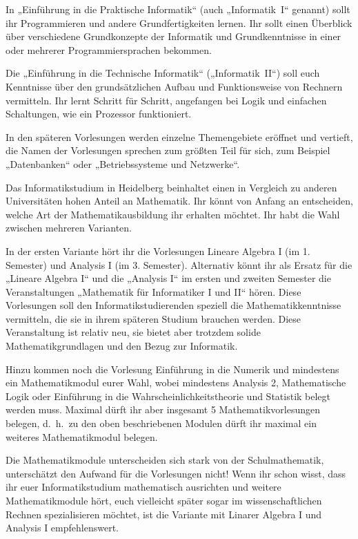 In „Einführung in die Praktische Informatik“ (auch „Informatik~I“ genannt) sollt ihr Programmieren
und andere Grundfertigkeiten lernen. Ihr sollt einen Überblick über verschiedene Grundkonzepte der
Informatik und Grundkenntnisse in einer oder mehrerer Programmiersprachen bekommen.

Die „Einführung in die Technische Informatik“ („Informatik~II“) soll euch Kenntnisse über den
grundsätzlichen Aufbau und Funktionsweise von Rechnern vermitteln. Ihr lernt Schritt für Schritt,
angefangen bei Logik und einfachen Schaltungen, wie ein Prozessor funktioniert.

In den späteren Vorlesungen werden einzelne Themengebiete eröffnet und vertieft, die Namen der
Vorlesungen sprechen zum größten Teil für sich, zum Beispiel „Datenbanken“ oder „Betriebssysteme
und Netzwerke“.

Das Informatikstudium in Heidelberg beinhaltet einen in Vergleich zu anderen Universitäten hohen
Anteil an Mathematik. Ihr könnt von Anfang an entscheiden, welche Art der Mathematikausbildung ihr
erhalten möchtet. Ihr habt die Wahl zwischen mehreren Varianten.

In der ersten Variante hört ihr die Vorlesungen Lineare Algebra I (im 1.
Semester) und Analysis I (im 3. Semester). Alternativ könnt ihr als Ersatz für
die „Lineare Algebra I“ und die „Analysis I“ im ersten und zweiten Semester die
Veranstaltungen „Mathematik für Informatiker I und II“ hören.  Diese
Vorlesungen soll den Informatikstudierenden speziell die Mathematikkenntnisse
vermitteln, die sie in ihrem späteren Studium brauchen werden. Diese
Veranstaltung ist relativ neu, sie bietet aber trotzdem solide
Mathematikgrundlagen und den Bezug zur Informatik.

Hinzu kommen noch die Vorlesung Einführung in die Numerik und mindestens ein
Mathematikmodul eurer Wahl, wobei mindestens Analysis 2, Mathematische Logik
oder Einführung in die Wahrscheinlichkeitstheorie und Statistik belegt werden
muss.  Maximal dürft ihr aber insgesamt 5 Mathematikvorlesungen belegen, d.\
h.\ zu den oben beschriebenen Modulen dürft ihr maximal ein weiteres
Mathematikmodul belegen.

Die Mathematikmodule unterscheiden sich stark von der Schulmathematik,
unterschätzt den Aufwand für die Vorlesungen nicht!  Wenn ihr schon wisst, dass
ihr euer Informatikstudium mathematisch ausrichten und weitere Mathematikmodule
hört, euch vielleicht später sogar im wissenschaftlichen Rechnen spezialisieren
möchtet, ist die Variante mit Linarer Algebra I und Analysis I empfehlenswert.

